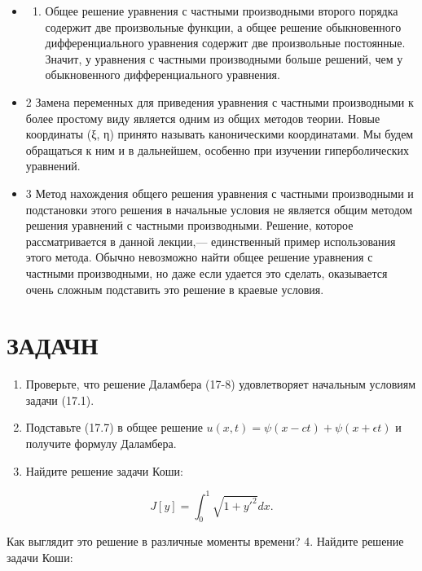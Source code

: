 \documentclass[
  ukrainian,
]{article}
\providecommand{\tightlist}{%
  \setlength{\itemsep}{0pt}\setlength{\parskip}{0pt}}
\begin{document}
\begin{itemize}
\tightlist
\item
  \begin{enumerate}
  \def\labelenumi{\arabic{enumi}.}
  \tightlist
  \item
    Общее решение уравнения с частными производными второго порядка
    содержит две произвольные функции, а общее решение обыкновенного
    дифференциального уравнения содержит две произвольные постоянные.
    Значит, у уравнения с частными производными больше решений, чем у
    обыкновенного дифференциального уравнения.
  \end{enumerate}
\item
  2 Замена переменных для приведения уравнения с частными производными к
  более простому виду является одним из общих методов теории. Новые
  координаты (ξ, η) принято называть каноническими координатами. Мы
  будем обращаться к ним и в дальнейшем, особенно при изучении
  гиперболических уравнений.
\item
  3 Метод нахождения общего решения уравнения с частными производными и
  подстановки этого решения в начальные условия не является общим
  методом решения уравнений с частными производными. Решение, которое
  рассматривается в данной лекции,--- единственный пример использования
  этого метода. Обычно невозможно найти общее решение уравнения с
  частными производными, но даже если удается это сделать, оказывается
  очень сложным подставить это решение в краевые условия.
\end{itemize}

\section{ЗАДАЧН}\label{ux437ux430ux434ux430ux447ux43d}

\begin{enumerate}
\def\labelenumi{\arabic{enumi}.}
\item
  Проверьте, что решение Даламбера (17-8) удовлетворяет начальным
  условиям задачи (17.1).
\item
  Подставьте (17.7) в общее решение
  \(u(x, t) = \psi(x - ct) + \psi(x + \epsilon t)\) и получите формулу
  Даламбера.
\item
  Найдите решение задачи Коши:
\end{enumerate}

\[
J[y] = \int_{0}^{1} \sqrt{1 + y'^{2}} dx.
\]

Как выглядит это решение в различные моменты времени? 4. Найдите решение
задачи Коши:
\end{document}
